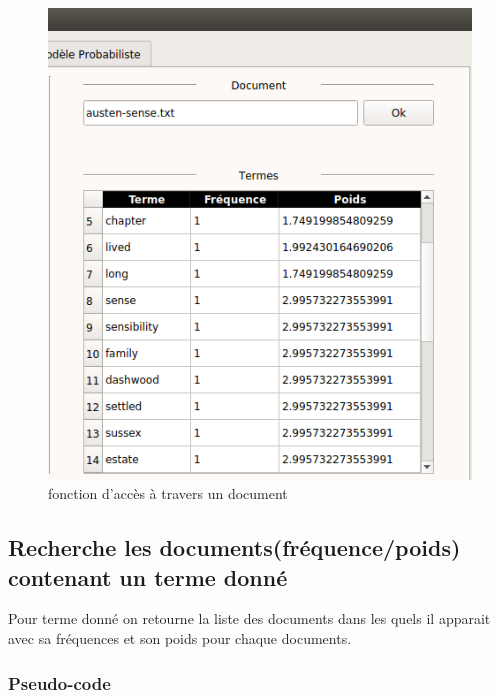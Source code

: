 \documentclass[12pt,a4paper,oneside]{article}
\begin{document}
	\begin{figure}[H]
		\centering
		\includegraphics[scale=0.48]{images/f1.png}
		\caption{fonction d'accès à travers un document}
	\end{figure}



\subsection{Recherche les documents(fréquence/poids) contenant un terme donné}
Pour terme donné on retourne la liste des documents dans les quels il apparait avec sa fréquences et son poids pour chaque documents.

\subsubsection*{Pseudo-code}
\begin{algorithm}[H]
	\DontPrintSemicolon
	
	
		        
	\;
	\caption{{\sc  }}
	\label{algo:duplicate2}
\end{algorithm}
\end{document}

